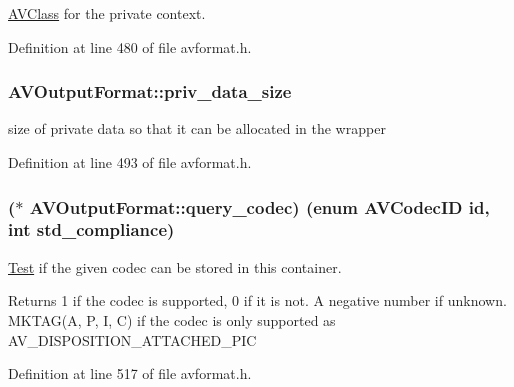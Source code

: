 \hyperlink{struct_a_v_class}{A\+V\+Class} for the private context. 



Definition at line 480 of file avformat.\+h.

\subsubsection[{\texorpdfstring{priv\+\_\+data\+\_\+size}{priv_data_size}}]{ A\+V\+Output\+Format\+::priv\+\_\+data\+\_\+size}\hypertarget{struct_a_v_output_format_ad7677ef35d272b2dad5498c51b4d2204}{}\label{struct_a_v_output_format_ad7677ef35d272b2dad5498c51b4d2204}
size of private data so that it can be allocated in the wrapper 

Definition at line 493 of file avformat.\+h.

\subsubsection[{\texorpdfstring{query\+\_\+codec}{query_codec}}]{($\ast$ A\+V\+Output\+Format\+::query\+\_\+codec) (enum {\bf A\+V\+Codec\+ID} id, {\bf int} std\+\_\+compliance)}\hypertarget{struct_a_v_output_format_a2622bb891412cf52010a54afb622abc9}{}\label{struct_a_v_output_format_a2622bb891412cf52010a54afb622abc9}
\hyperlink{struct_test}{Test} if the given codec can be stored in this container.

\begin{DoxyReturn}{Returns}
1 if the codec is supported, 0 if it is not. A negative number if unknown. M\+K\+T\+AG(\textquotesingle{}A\textquotesingle{}, \textquotesingle{}P\textquotesingle{}, \textquotesingle{}I\textquotesingle{}, \textquotesingle{}C\textquotesingle{}) if the codec is only supported as A\+V\+\_\+\+D\+I\+S\+P\+O\+S\+I\+T\+I\+O\+N\+\_\+\+A\+T\+T\+A\+C\+H\+E\+D\+\_\+\+P\+IC 
\end{DoxyReturn}


Definition at line 517 of file avformat.\+h.

